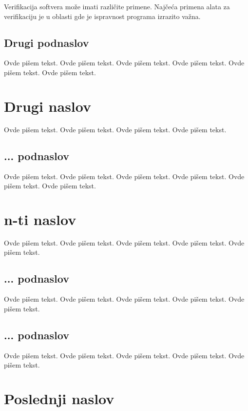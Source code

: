 \documentclass[a4paper]{article}
\begin{document}
Verifikacija softvera može imati različite primene.  Najčeća primena alata za verifikaciju je u oblasti  gde je ispravnost programa izrazito važna. 


\subsection{Drugi podnaslov}
\label{subsec:podnaslov2}

Ovde pišem tekst. 
Ovde pišem tekst. 
Ovde pišem tekst. 
Ovde pišem tekst. 
Ovde pišem tekst. 
Ovde pišem tekst. 

\section{Drugi naslov}
\label{sec:naslov2}

Ovde pišem tekst. 
Ovde pišem tekst. 
Ovde pišem tekst. 
Ovde pišem tekst. 

\subsection{... podnaslov}
\label{subsec:podnaslovN}

Ovde pišem tekst. 
Ovde pišem tekst. 
Ovde pišem tekst. 
Ovde pišem tekst. 
Ovde pišem tekst. 
Ovde pišem tekst. 

\section{n-ti naslov}
\label{sec:naslovN}

Ovde pišem tekst. 
Ovde pišem tekst. 
Ovde pišem tekst. 
Ovde pišem tekst. 
Ovde pišem tekst. 

\subsection{... podnaslov}
\label{subsec:podnaslovK}

Ovde pišem tekst. 
Ovde pišem tekst. 
Ovde pišem tekst. 
Ovde pišem tekst. 
Ovde pišem tekst. 

\subsection{... podnaslov}
\label{subsec:podnaslovM}

Ovde pišem tekst. 
Ovde pišem tekst. 
Ovde pišem tekst. 
Ovde pišem tekst. 
Ovde pišem tekst. 

\section{Poslednji naslov}
\label{sec:naslovM}
\end{document}
